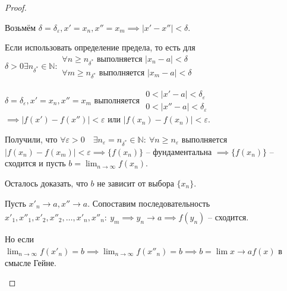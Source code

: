 \documentclass[a4paper,oneside]{article}
\newcommand{\dslim}{\displaystyle\lim}
\newcommand{\dslimn}{\dslim_{n \to \infty}}
\newcommand{\N}{\mathbb{N}}
\newcommand{\eps}{\varepsilon}
\newcommand{\approach}[1]{\underset{#1}{\longrightarrow}}
\begin{document}
\begin{proof}
\begin{enumerate}[label=\alph*)]
            Возьмём $\delta = \delta_\eps, x' = x_n, x'' = x_m \implies | x' - x'' | < \delta$.

            Если использовать определение предела, то есть для $\delta > 0 \exists n_{\delta^*} \in \N:
            \begin{array}{c}
                \forall n \ge n_{\delta^*} \text{ выполняется } | x_n - a | < \delta \\
                \forall m \ge n_{\delta^*} \text{ выполняется } | x_m - a | < \delta
            \end{array}$

            $\delta = \delta_\eps, x' = x_n, x'' = x_m$ выполняется
            $\begin{array}{c}
                0 < |x' - a| < \delta_\eps \\
                0 < |x'' - a| < \delta_\eps
            \end{array}$
            $\implies |f(x') - f(x'')| < \eps$ или $|f(x_n) - f(x_n)| < \eps$.
            
            Получили, что $\forall \eps > 0 \quad \exists n_\eps = n_{\delta^*} \in \N: \:
            \forall n \ge n_\eps$ выполняется $|f(x_n) - f(x_m)| < \eps \implies
            \{ f(x_n) \}$ -- фундаментальна $\implies \{ f(x_n) \}$ -- сходится и пусть
            $b = \dslimn f(x_n)$.

            Осталось доказать, что $b$ не зависит от выбора $\{ x_n \}$.

            Пусть $x'_n \approach{} a, x'' \approach{} a$. Сопоставим последовательность
            $x'_1, x''_1, x'_2, x''_2, \dots, x'_n, x''_n: \: y_m \implies y_n \approach{} a
            \implies f(y_n)$ -- сходится.

            Но если $\dslimn f(x'_n) = b \implies \dslimn f(x''_n) = b \implies b = \dslim{x \to a} f(x)$
            в смысле Гейне.
    \end{enumerate}
\end{proof}
\end{document}
